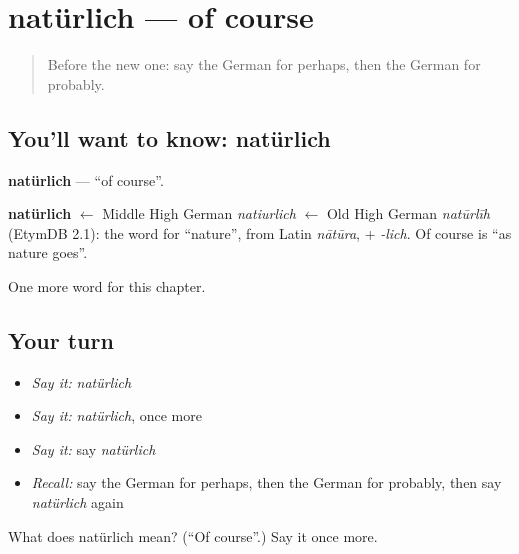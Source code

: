 \section[natürlich]{natürlich — of course}

\label{lesson:GE-C172-natuerlich}



\begin{quote}
Before the new one: say the German for perhaps, then the German for probably.
\end{quote}

\subsection*{You'll want to know: natürlich}
\textbf{natürlich} — \textquotedblleft{}of course\textquotedblright{}.

\begin{cousinweb}
\textbf{natürlich} $\leftarrow$ Middle High German \emph{natiurlich} $\leftarrow$ Old High German \emph{natūrlīh} (EtymDB 2.1): the word for \textquotedblleft{}nature\textquotedblright{}, from Latin \emph{nātūra}, + \emph{-lich}. Of course is \textquotedblleft{}as nature goes\textquotedblright{}.
\end{cousinweb}

\begin{grammarlens}[title={What you've built}]
One more word for this chapter.
\end{grammarlens}

\subsection*{Your turn}
\begin{itemize}
\raggedright
  \item \emph{Say it:} \emph{natürlich}
  \item \emph{Say it:} \emph{natürlich}, once more
  \item \emph{Say it:} say \emph{natürlich}
  \item \emph{Recall:} say the German for perhaps, then the German for probably, then say \emph{natürlich} again
\end{itemize}

\begin{tcolorbox}[breakable,colback=teal!4,colframe=teal!35!black,title={Before you move on}]
What does natürlich mean? (\textquotedblleft{}Of course\textquotedblright{}.) Say it once more.
\end{tcolorbox}
